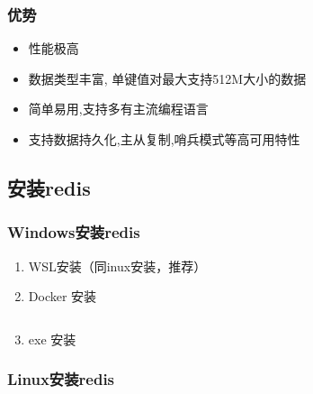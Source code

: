\subsubsection{优势}
\begin{itemize}
\item 性能极高
\item 数据类型丰富, 单键值对最大支持512M大小的数据
\item 简单易用,支持多有主流编程语言
\item 支持数据持久化,主从复制,哨兵模式等高可用特性
\end{itemize}

\subsection{安装redis}
\subsubsection{Windows安装redis}
\begin{enumerate}
\item WSL安装（同inux安装，推荐）
\item Docker 安装
\begin{lstlisting}[language=none]

\end{lstlisting}
\item exe 安装
\end{enumerate}
\subsubsection{Linux安装redis}
